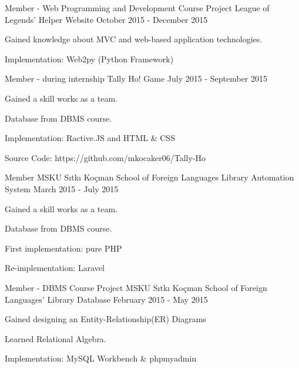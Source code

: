 \begin{cventries}
    \cventry
        {Member - Web Programming and Development Course Project}
        {League of Legends' Helper Website}
        {}
        {October 2015 - December 2015}
        {
            \begin{cvitems}
                \item {Gained knowledge about MVC and web-based application technologies.}
                \item {Implementation: Web2py (Python Framework)}
            \end{cvitems}
        }

    \cventry
        {Member - during internship}
        {Tally Ho! Game}
        {}
        {July 2015 - September 2015}
        {
            \begin{cvitems}
                \item {Gained a skill works as a team.}
                \item {Database from DBMS course.}
                \item {Implementation: Ractive.JS and HTML \& CSS} 
                \item {Source Code: https://github.com/mkocaker06/Tally-Ho} 
            \end{cvitems}
        }

    \cventry
        {Member}
        {MSKU Sıtkı Koçman School of Foreign Languages Library Automation System}
        {}
        {March 2015 - July 2015}
        {
            \begin{cvitems}
                \item {Gained a skill works as a team.}
                \item {Database from DBMS course.}
                \item {First implementation: pure PHP}
                \item {Re-implementation: Laravel}
            \end{cvitems}
        }

    \cventry
        {Member - DBMS Course Project}
        {MSKU Sıtkı Koçman School of Foreign Languages' Library Database}
        {}
        {February 2015 - May 2015}
        {
            \begin{cvitems}
                \item {Gained designing an Entity-Relationship(ER) Diagrams}
                \item {Learned Relational Algebra.}
                \item {Implementation: MySQL Workbench \& phpmyadmin}
            \end{cvitems}
        }

\end{cventries}
